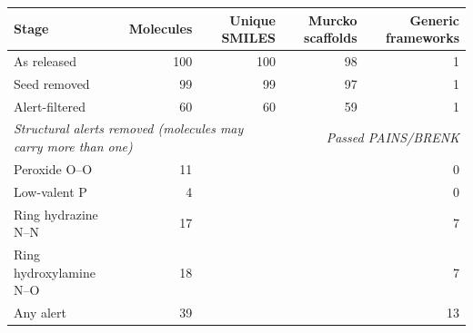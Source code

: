 \begin{tabular}{lrrrr}
\toprule
Stage & Molecules & Unique SMILES & Murcko scaffolds & Generic frameworks \\
\midrule
As released & 100 & 100 & 98 & 1 \\
Seed removed & 99 & 99 & 97 & 1 \\
Alert-filtered & 60 & 60 & 59 & 1 \\
\midrule
\multicolumn{3}{l}{\textit{Structural alerts removed (molecules may carry more than one)}} & \multicolumn{2}{r}{\textit{Passed PAINS/BRENK}} \\
\quad Peroxide O--O & 11 & & \multicolumn{2}{r}{0} \\
\quad Low-valent P & 4 & & \multicolumn{2}{r}{0} \\
\quad Ring hydrazine N--N & 17 & & \multicolumn{2}{r}{7} \\
\quad Ring hydroxylamine N--O & 18 & & \multicolumn{2}{r}{7} \\
\quad Any alert & 39 & & \multicolumn{2}{r}{13} \\
\bottomrule
\end{tabular}
